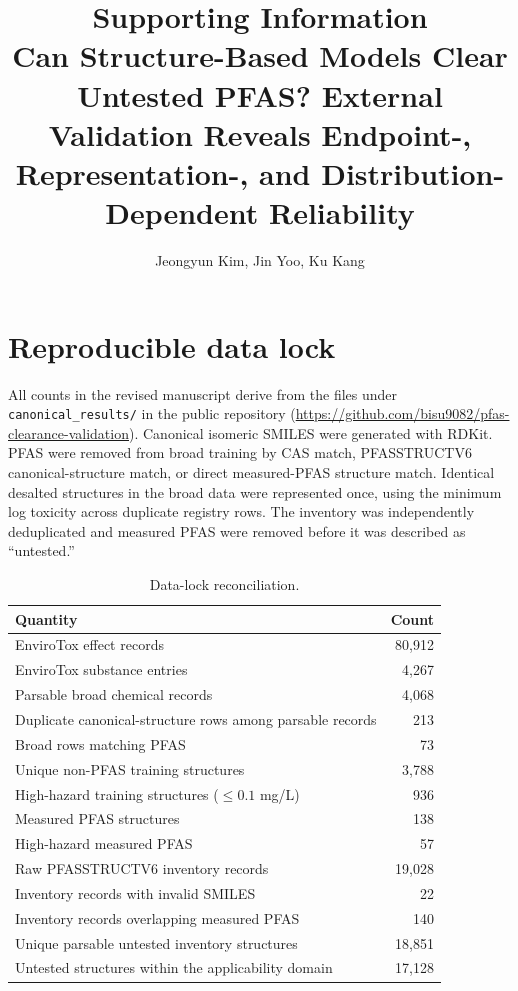 \documentclass[11pt]{article}
\title{Supporting Information\\[4pt]
\large Can Structure-Based Models Clear Untested PFAS? External Validation Reveals Endpoint-, Representation-, and Distribution-Dependent Reliability}
\author{Jeongyun Kim, Jin Yoo, Ku Kang}
\date{}
\begin{document}
\maketitle

\section{Reproducible data lock}

All counts in the revised manuscript derive from the files under
\texttt{canonical\_results/} in the public repository
(\url{https://github.com/bisu9082/pfas-clearance-validation}). Canonical isomeric SMILES were generated with RDKit.
PFAS were removed from broad training by CAS match, PFASSTRUCTV6 canonical-structure
match, or direct measured-PFAS structure match. Identical desalted structures in the
broad data were represented once, using the minimum log toxicity across duplicate
registry rows. The inventory was independently deduplicated and measured PFAS were
removed before it was described as ``untested.''

\begin{table}[h]
\centering
\caption{Data-lock reconciliation.}
\begin{tabular}{lr}
\toprule
Quantity & Count \\
\midrule
EnviroTox effect records & 80,912 \\
EnviroTox substance entries & 4,267 \\
Parsable broad chemical records & 4,068 \\
Duplicate canonical-structure rows among parsable records & 213 \\
Broad rows matching PFAS & 73 \\
Unique non-PFAS training structures & 3,788 \\
High-hazard training structures ($\leq0.1$ mg/L) & 936 \\
Measured PFAS structures & 138 \\
High-hazard measured PFAS & 57 \\
Raw PFASSTRUCTV6 inventory records & 19,028 \\
Inventory records with invalid SMILES & 22 \\
Inventory records overlapping measured PFAS & 140 \\
Unique parsable untested inventory structures & 18,851 \\
Untested structures within the applicability domain & 17,128 \\
\bottomrule
\end{tabular}
\end{table}
\end{document}
